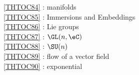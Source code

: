 \ref {THTOC84} : manifolds\\
\ref {THTOC85} : Immersions and Embeddings\\
\ref {THTOC86} : Lie groups\\
\ref {THTOC87} : \( \GL (n,\eC )\)\\
\ref {THTOC88} : \( \SU (n)\)\\
\ref {THTOC89} : flow of a vector field\\
\ref {THTOC90} : exponential\\
